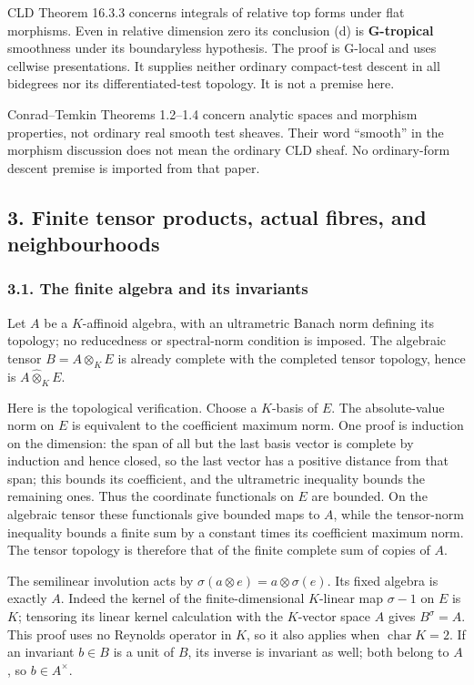 \documentclass[
  11pt,
]{article}
\begin{document}
CLD Theorem 16.3.3 concerns integrals of relative top forms under flat
morphisms. Even in relative dimension zero its conclusion (d) is
\textbf{G-tropical} smoothness under its boundaryless hypothesis. The
proof is G-local and uses cellwise presentations. It supplies neither
ordinary compact-test descent in all bidegrees nor its
differentiated-test topology. It is not a premise here.

Conrad--Temkin Theorems 1.2--1.4 concern analytic spaces and morphism
properties, not ordinary real smooth test sheaves. Their word ``smooth''
in the morphism discussion does not mean the ordinary CLD sheaf. No
ordinary-form descent premise is imported from that paper.

\subsection{3. Finite tensor products, actual fibres, and
neighbourhoods}\label{finite-tensor-products-actual-fibres-and-neighbourhoods}

\subsubsection{3.1. The finite algebra and its
invariants}\label{the-finite-algebra-and-its-invariants}

Let \(A\) be a \(K\)-affinoid algebra, with an ultrametric Banach norm
defining its topology; no reducedness or spectral-norm condition is
imposed. The algebraic tensor \(B=A\otimes_K E\) is already complete
with the completed tensor topology, hence is \(A\widehat\otimes_K E\).

Here is the topological verification. Choose a \(K\)-basis of \(E\). The
absolute-value norm on \(E\) is equivalent to the coefficient maximum
norm. One proof is induction on the dimension: the span of all but the
last basis vector is complete by induction and hence closed, so the last
vector has a positive distance from that span; this bounds its
coefficient, and the ultrametric inequality bounds the remaining ones.
Thus the coordinate functionals on \(E\) are bounded. On the algebraic
tensor these functionals give bounded maps to \(A\), while the
tensor-norm inequality bounds a finite sum by a constant times its
coefficient maximum norm. The tensor topology is therefore that of the
finite complete sum of copies of \(A\).

The semilinear involution acts by
\(\sigma(a\otimes e)=a\otimes\sigma(e)\). Its fixed algebra is exactly
\(A\). Indeed the kernel of the finite-dimensional \(K\)-linear map
\(\sigma-1\) on \(E\) is \(K\); tensoring its linear kernel calculation
with the \(K\)-vector space \(A\) gives \(B^\sigma=A\). This proof uses
no Reynolds operator in \(K\), so it also applies when
\(\operatorname{char}K=2\). If an invariant \(b\in B\) is a unit of
\(B\), its inverse is invariant as well; both belong to \(A\), so
\(b\in A^\times\).
\end{document}
